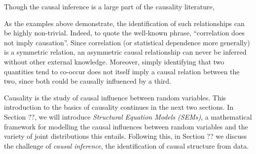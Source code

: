 Though the causal inference is a large part of the causality literature,

As the examples above demonstrate, the identification of such relationships can be highly non-trivial. 
Indeed, to quote the well-known phrase, ``correlation does not imply causation''. 
Since correlation (or statistical dependence more generally) is a symmetric relation, an asymmetric causal relationship can never be inferred without other external knowledge. 
Moreover, simply identifying that two quantities tend to co-occur does not itself imply a causal relation between the two, since both could be causally influenced by a third.

Causality is the study of causal influence between random variables.
This introduction to the basics of causality continues in the next two sections.
In Section ??, we will introduce \emph{Structural Equation Models (SEMs)}, a mathematical framework for modelling the causal influences between random variables and the variety of joint distributions this entails.
Following this, in Section ?? we discuss the challenge of \emph{causal inference}, the identification of causal structure from data.








